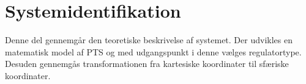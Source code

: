 \part{Systemidentifikation}
Denne del gennemgår den teoretiske beskrivelse af systemet.
Der udvikles en matematisk model af PTS og med udgangspunkt i denne vælges regulatortype.
Desuden gennemgås transformationen fra kartesiske koordinater til sfæriske koordinater.



%
